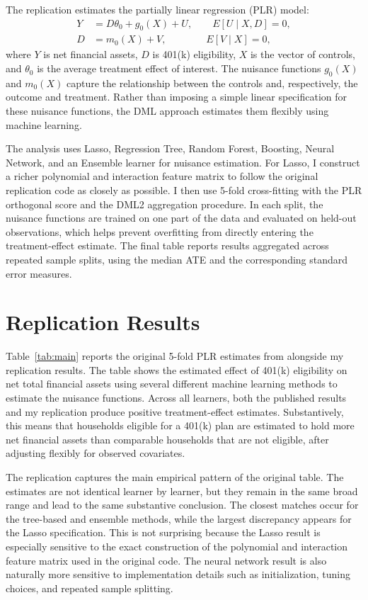 \documentclass[12pt]{article}
\begin{document}
	The replication estimates the partially linear regression (PLR) model:
	\begin{align}
		Y &= D\theta_0 + g_0(X) + U, \qquad E[U \mid X, D] = 0, \\
		D &= m_0(X) + V, \qquad\qquad  E[V \mid X] = 0,
	\end{align}
	where $Y$ is net financial assets, $D$ is 401(k) eligibility, $X$ is the vector of controls, and $\theta_0$ is the average treatment effect of interest. The nuisance functions $g_0(X)$ and $m_0(X)$ capture the relationship between the controls and, respectively, the outcome and treatment. Rather than imposing a simple linear specification for these nuisance functions, the DML approach estimates them flexibly using machine learning.
	
	The analysis uses Lasso, Regression Tree, Random Forest, Boosting, Neural Network, and an Ensemble learner for nuisance estimation. For Lasso, I construct a richer polynomial and interaction feature matrix to follow the original replication code as closely as possible. I then use 5-fold cross-fitting with the PLR orthogonal score and the DML2 aggregation procedure. In each split, the nuisance functions are trained on one part of the data and evaluated on held-out observations, which helps prevent overfitting from directly entering the treatment-effect estimate. The final table reports results aggregated across repeated sample splits, using the median ATE and the corresponding standard error measures.
	
	\section{Replication Results}
	
	Table~\ref{tab:main} reports the original 5-fold PLR estimates from \cite{chernozhukov2018} alongside my replication results. The table shows the estimated effect of 401(k) eligibility on net total financial assets using several different machine learning methods to estimate the nuisance functions. Across all learners, both the published results and my replication produce positive treatment-effect estimates. Substantively, this means that households eligible for a 401(k) plan are estimated to hold more net financial assets than comparable households that are not eligible, after adjusting flexibly for observed covariates.
	
	
	
	The replication captures the main empirical pattern of the original table. The estimates are not identical learner by learner, but they remain in the same broad range and lead to the same substantive conclusion. The closest matches occur for the tree-based and ensemble methods, while the largest discrepancy appears for the Lasso specification. This is not surprising because the Lasso result is especially sensitive to the exact construction of the polynomial and interaction feature matrix used in the original code. The neural network result is also naturally more sensitive to implementation details such as initialization, tuning choices, and repeated sample splitting.
	
\end{document}
